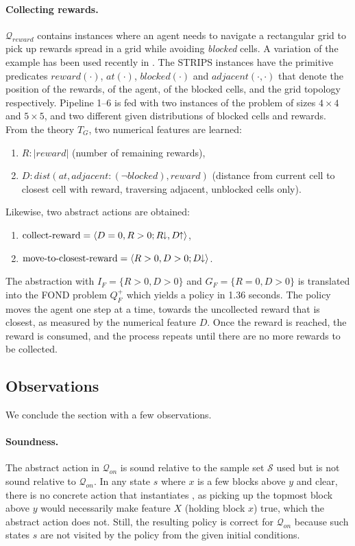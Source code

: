 \documentclass[letterpaper]{article} %
\newcommand{\tup}[1]{\langle #1 \rangle}
\newcommand{\abs}[1]{\ensuremath{\left\vert{#1}\right\vert}}
\newcommand{\Q}{\mathcal{Q}}
\renewcommand{\S}{\mathcal{S}}
\newcommand{\abst}[2]{\tup{#1;#2}}
\newcommand{\pplus}{\hspace{-.05em}\raisebox{.15ex}{\footnotesize$\uparrow$}}
\newcommand{\mminus}{\hspace{-.05em}\raisebox{.15ex}{\footnotesize$\downarrow$}}
\begin{document}
\paragraph{Collecting rewards.}
$\Q_{reward}$ contains instances where  an agent needs to navigate a rectangular
grid to pick up  rewards spread in a grid  while 
avoiding \emph{blocked} cells. A variation of the example
has been used recently in \cite{garnelo2016towards}.
The STRIPS instances have the primitive predicates $reward(\cdot)$, $at(\cdot)$, $blocked(\cdot)$
and $adjacent(\cdot,\cdot)$ that denote the position of the rewards, of
the agent, of the blocked cells, and the grid topology respectively.
Pipeline 1--6  is fed with two instances of the problem of sizes $4 \times 4$
and $5\times 5$, and two different  given distributions of blocked cells  and rewards.
From the theory $T_G$, two numerical  features are learned:
\begin{enumerate}[--]
  \item $R: \abs{reward}$ (number of remaining rewards), 
  \item $D: dist(at, adjacent{:}(\neg blocked), reward)$ (distance from current
    cell to closest cell with reward, traversing adjacent, unblocked cells only).
\end{enumerate}
Likewise, two abstract actions are obtained:
\begin{enumerate}[--]
  \item $\text{collect-reward} = \abst{D=0, R > 0}{R\mminus, D\pplus}$,
  \item $\text{move-to-closest-reward} = \abst{R>0, D>0}{D\mminus}$.
\end{enumerate}

The abstraction with $I_F = \{ R>0, D>0 \}$ and $G_F=\{R=0,D>0\}$
is translated into the  FOND problem $Q^+_F$ which yields
a policy  in 1.36 seconds. The policy moves the agent
one step at a time, towards  the uncollected  reward
that is closest, as measured by the numerical feature $D$.
Once the reward is reached, the reward is consumed, and
the process repeats until there are no more rewards to be collected. 


\subsection{Observations}

We conclude the section with a few observations.

\paragraph{Soundness.} The abstract action  in $\Q_{on}$
is sound relative to the sample set $\S$ used  but is not sound relative
to $\Q_{on}$. In any state $s$ where $x$ is a few blocks above $y$ and clear,
there is no concrete action that instantiates ,
as picking up the topmost block above $y$ would necessarily make feature $X$ (holding block $x$)
true, which the abstract action does not. Still, the resulting policy is correct
for $\Q_{on}$ because such states $s$ are not  visited by the policy
from the given initial conditions.
\end{document}
